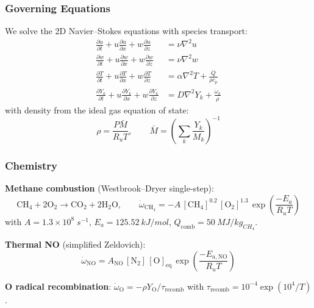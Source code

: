 \documentclass[11pt]{article}
\begin{document}
\subsubsection{Governing Equations}
We solve the 2D Navier--Stokes equations with species transport:
\begin{align}
    \frac{\partial u}{\partial t} + u\frac{\partial u}{\partial x} + w\frac{\partial u}{\partial z} &= \nu \nabla^2 u \label{eq:mom_u} \\
    \frac{\partial w}{\partial t} + u\frac{\partial w}{\partial x} + w\frac{\partial w}{\partial z} &= \nu \nabla^2 w \label{eq:mom_w} \\
    \frac{\partial T}{\partial t} + u\frac{\partial T}{\partial x} + w\frac{\partial T}{\partial z} &= \alpha \nabla^2 T + \frac{\dot{Q}}{\rho c_p} \label{eq:energy} \\
    \frac{\partial Y_k}{\partial t} + u\frac{\partial Y_k}{\partial x} + w\frac{\partial Y_k}{\partial z} &= D \nabla^2 Y_k + \frac{\dot{\omega}_k}{\rho} \label{eq:species}
\end{align}
with density from the ideal gas equation of state:
\begin{equation}
    \rho = \frac{P \bar{M}}{R_u T}, \qquad \bar{M} = \left(\sum_k \frac{Y_k}{M_k}\right)^{-1}
\end{equation}

\subsubsection{Chemistry}
\textbf{Methane combustion} (Westbrook--Dryer single-step):
\begin{equation}
    \mathrm{CH_4 + 2O_2 \rightarrow CO_2 + 2H_2O}, \qquad
    \dot{\omega}_{\mathrm{CH}_4} = -A \,[\mathrm{CH}_4]^{0.2}\,[\mathrm{O}_2]^{1.3}\,\exp\!\left(\frac{-E_a}{R_u T}\right)
\end{equation}
with $A = 1.3\times10^8\;\si{s^{-1}}$, $E_a = \SI{125.52}{kJ/mol}$, $Q_\mathrm{comb} = \SI{50}{MJ/kg_{CH_4}}$.

\textbf{Thermal NO} (simplified Zeldovich):
\begin{equation}
    \dot{\omega}_{\mathrm{NO}} = A_{\mathrm{NO}}\,[\mathrm{N}_2]\,[\mathrm{O}]_\mathrm{eq}\,\exp\!\left(\frac{-E_{a,\mathrm{NO}}}{R_u T}\right)
\end{equation}

\textbf{O radical recombination}: $\dot{\omega}_\mathrm{O} = -\rho Y_\mathrm{O}/\tau_\mathrm{recomb}$ with $\tau_\mathrm{recomb} = 10^{-4}\exp(10^4/T)$.
\end{document}
